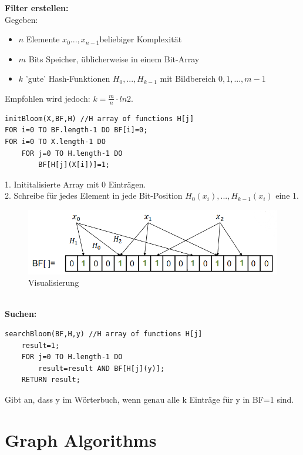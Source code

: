 \documentclass{article}
\begin{document}
            \textbf{Filter erstellen:}\\
            Gegeben: 
            \begin{itemize}
                \item $n$ Elemente $x_0...,x_{n-1} $beliebiger Komplexität
                \item $m$ Bits Speicher, üblicherweise in einem Bit-Array
                \item $k$ 'gute' Hash-Funktionen $H_0,...,H_{k-1}$ mit Bildbereich $0,1,...,m-1$
            \end{itemize}
            Empfohlen wird jedoch: $k=\frac{m}{n}\cdot ln2$.\\
            \begin{lstlisting}[style=pseudocode]
initBloom(X,BF,H) //H array of functions H[j]
FOR i=0 TO BF.length-1 DO BF[i]=0;
FOR i=0 TO X.length-1 DO
    FOR j=0 TO H.length-1 DO
        BF[H[j](X[i])]=1;
            \end{lstlisting}
            1. Inititalisierte Array mit 0 Einträgen.\\
            2. Schreibe für jedes Element in jede Bit-Position $H_0(x_i),...,H_{k-1}(x_i)$ eine 1. \\
            \begin{figure}[ht]
                \centering
                \includegraphics[width=1\textwidth]{Bilder/Bloom.png}
                \caption{Visualisierung}
                \label{fig:Bloom}
            \end{figure}\\
            \textbf{Suchen:}
            \begin{lstlisting}[style=pseudocode]
searchBloom(BF,H,y) //H array of functions H[j]
    result=1;
    FOR j=0 TO H.length-1 DO
        result=result AND BF[H[j](y)];
    RETURN result;
            \end{lstlisting}
            Gibt an, dass y im Wörterbuch, wenn genau alle k Einträge für y in BF=1 sind.

    \newpage
    \section{Graph Algorithms}
\end{document}
